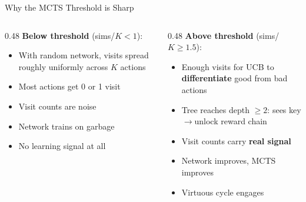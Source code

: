 \documentclass[aspectratio=169, 10pt]{beamer}
\begin{document}
\begin{frame}{Why the MCTS Threshold is Sharp}

\begin{columns}[T]
\begin{column}{0.48\textwidth}
\textbf{Below threshold} (sims/$K < 1$):
\begin{itemize}
  \item With random network, visits spread roughly uniformly across $K$ actions
  \item Most actions get 0 or 1 visit
  \item Visit counts are \alert{noise}
  \item Network trains on garbage
  \item No learning signal at all
\end{itemize}
\end{column}
\begin{column}{0.48\textwidth}
\textbf{Above threshold} (sims/$K \geq 1.5$):
\begin{itemize}
  \item Enough visits for UCB to \textbf{differentiate} good from bad actions
  \item Tree reaches depth $\geq 2$: sees key$\to$unlock reward chain
  \item Visit counts carry \textbf{real signal}
  \item Network improves, MCTS improves
  \item Virtuous cycle engages
\end{itemize}
\end{column}
\end{columns}

\vspace{0.5cm}
\begin{center}
\end{center}
\end{frame}
\end{document}
